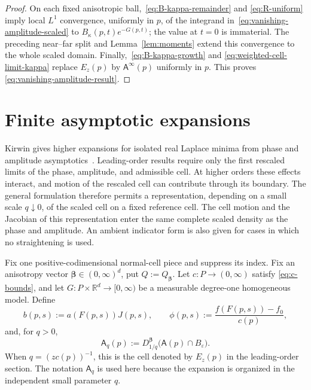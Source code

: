 \documentclass[11pt]{amsart}
\numberwithin{equation}{section}
\theoremstyle{definition}
\theoremstyle{remark}
\newcommand{\R}{\mathbb{R}}
\newcommand{\eps}{\varepsilon}
\newcommand{\Afib}{\mathsf{A}}
\begin{document}
\begin{proof}
On each fixed anisotropic ball,~\eqref{eq:B-kappa-remainder} and
\eqref{eq:R-uniform} imply local $L^1$ convergence, uniformly in $p$, of the
integrand in~\eqref{eq:vanishing-amplitude-scaled} to
$B_\kappa(p,t)e^{-G(p,t)}$; the value at $t=0$ is immaterial.  The preceding
near--far split and Lemma~\ref{lem:moments} extend this convergence to the
whole scaled domain.  Finally,~\eqref{eq:B-kappa-growth} and
\eqref{eq:weighted-cell-limit-kappa} replace $E_z(p)$ by
$\Afib^\infty(p)$ uniformly in $p$.  This proves
\eqref{eq:vanishing-amplitude-result}.
\end{proof}

\section{Finite asymptotic expansions}\label{sec:expansions}

Kirwin gives higher expansions for isolated real Laplace minima from phase and
amplitude asymptotics~\cite{Kirwin}.  Leading-order results require only the
first rescaled limits of the phase, amplitude, and admissible cell.  At higher
orders these effects interact, and motion of the rescaled cell can contribute
through its boundary.  The general formulation therefore permits a representation, depending on a
small scale $q\downarrow0$, of the scaled cell on a fixed reference cell.  The
cell motion and the Jacobian of this representation enter the
same complete scaled density as the phase and amplitude.  An ambient indicator form
is also given for cases in which no straightening is used.

Fix one positive-codimensional normal-cell piece and suppress its index.  Fix
an anisotropy vector $\bm\beta\in(0,\infty)^d$, put
$Q:=Q_{\bm\beta}$.  Let $c:P\to(0,\infty)$ satisfy
\eqref{eq:c-bounds}, and let
$G:P\times\R^d\to[0,\infty)$ be a measurable degree-one homogeneous
model.  Define
\begin{equation}\label{eq:b-phi}
 b(p,s):=a(F(p,s))J(p,s),
 \qquad
 \phi(p,s):=\frac{f(F(p,s))-f_0}{c(p)},
\end{equation}
and, for $q>0$,
\begin{equation}\label{eq:finite-scaled-cell}
 \Afib_q(p):=D_{1/q}^{\bm\beta}\bigl(\Afib(p)\cap B_\eps\bigr).
\end{equation}
When $q=(zc(p))^{-1}$, this is the cell denoted by $E_z(p)$ in the
leading-order section.  The notation $\Afib_q$ is used here because the
expansion is organized in the independent small parameter $q$.
\end{document}
